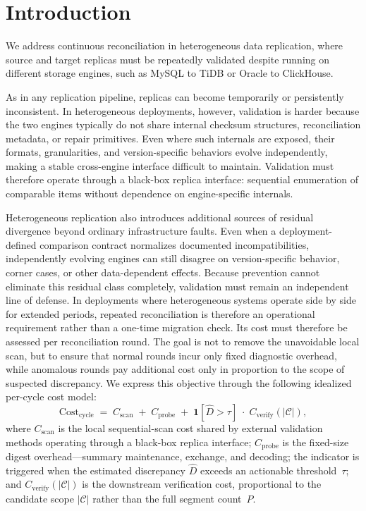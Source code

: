 \section{Introduction}
\label{sec:introduction}

We address continuous reconciliation in heterogeneous data replication, where source and target replicas must be repeatedly validated despite running on different storage engines, such as MySQL to TiDB or Oracle to ClickHouse.

As in any replication pipeline, replicas can become temporarily or persistently inconsistent. In heterogeneous deployments, however, validation is harder because the two engines typically do not share internal checksum structures, reconciliation metadata, or repair primitives. Even where such internals are exposed, their formats, granularities, and version-specific behaviors evolve independently, making a stable cross-engine interface difficult to maintain. Validation must therefore operate through a black-box replica interface: sequential enumeration of comparable items without dependence on engine-specific internals.

Heterogeneous replication also introduces additional sources of residual divergence beyond ordinary infrastructure faults. Even when a deployment-defined comparison contract normalizes documented incompatibilities, independently evolving engines can still disagree on version-specific behavior, corner cases, or other data-dependent effects. Because prevention cannot eliminate this residual class completely, validation must remain an independent line of defense. In deployments where heterogeneous systems operate side by side for extended periods, repeated reconciliation is therefore an operational requirement rather than a one-time migration check.
Its cost must therefore be assessed per reconciliation round. The goal is not to remove the unavoidable local scan, but to ensure that normal rounds incur only fixed diagnostic overhead, while anomalous rounds pay additional cost only in proportion to the scope of suspected discrepancy. We express this objective through the following idealized per-cycle cost model:
\[
\text{Cost}_{\text{cycle}}
  \;=\; C_{\text{scan}}
  \;+\; C_{\text{probe}}
  \;+\; \mathbf{1}[\hat{D}>\tau]\;\cdot\;
        C_{\text{verify}}(|\mathcal{C}|),
\]
where $C_{\text{scan}}$ is the local sequential-scan cost shared by external
validation methods operating through a black-box replica interface;
$C_{\text{probe}}$ is the fixed-size digest overhead---summary maintenance,
exchange, and decoding; the indicator is triggered when the estimated
discrepancy $\hat{D}$ exceeds an actionable threshold~$\tau$; and
$C_{\text{verify}}(|\mathcal{C}|)$ is the downstream verification cost,
proportional to the candidate scope $|\mathcal{C}|$ rather than the full
segment count~$P$.

